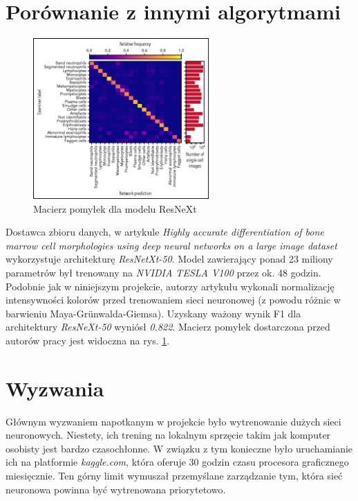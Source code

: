 \section{Porównanie z innymi algorytmami}

\begin{figure}
    \centering
    \includegraphics[width=0.6\textwidth]{resnext_confusion_matrix}
    \caption{Macierz pomyłek dla modelu ResNeXt \cite{resnext}}
    \label{fig:resnext_confusion_matrix}
\end{figure}

Dostawca zbioru danych, w artykule \textit{Highly accurate differentiation of bone marrow cell morphologies using deep neural networks on a large image dataset} \cite{resnext} wykorzystuje architekturę \textit{ResNetXt-50}.
Model zawierający ponad 23 miliony parametrów był trenowany na \textit{NVIDIA TESLA V100} przez ok. 48 godzin.
Podobnie jak w niniejszym projekcie, autorzy artykułu wykonali normalizację intensywności kolorów przed trenowaniem sieci neuronowej (z powodu różnic w barwieniu Maya-Grünwalda-Giemsa).
Uzyskany ważony wynik F1 dla architektury \textit{ResNeXt-50} wyniósł \textit{0.822}. Macierz pomyłek dostarczona przed autorów pracy jest widoczna na rys. \ref{fig:resnext_confusion_matrix}.


\section{Wyzwania}

Głównym wyzwaniem napotkanym w projekcie było wytrenowanie dużych sieci neuronowych.
Niestety, ich trening na lokalnym sprzęcie takim jak komputer osobisty jest bardzo czasochłonne.
W związku z tym konieczne było uruchamianie ich na platformie \textit{kaggle.com}, która oferuje 30 godzin czasu procesora graficznego miesięcznie.
Ten górny limit wymuszał przemyślane zarządzanie tym, która sieć neuronowa powinna być wytrenowana priorytetowo.


